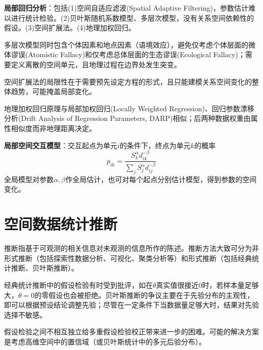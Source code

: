 \par \textbf{局部回归分析}：包括(1)空间自适应滤波(Spatial Adaptive Filtering)，参数估计难以进行统计检验。(2)贝叶斯随机系数模型、多层次模型，没有关系空间依赖性的假设。(3)空间扩展法。(4)地理加权回归。

\par 多层次模型同时包含个体因素和地点因素（语境效应），避免仅考虑个体层面的微体谬误(Atomistic Fallacy)和仅考虑总体层面的生态谬误(Ecological Fallacy)；需要定义离散的空间单元，且地理过程在边界处发生突变。

\par 空间扩展法的局限性在于需要预先设定方程的形式，且只能建模关系空间变化的整体趋势，可能掩盖局部变化。

\par 地理加权回归原理与局部加权回归(Locally Weighted Regression)、回归参数漂移分析(Drift Analysis of Regression Parameters, DARP)相似；后两种数据权重由属性相似度而非地理距离决定。

\par \textbf{局部空间交互模型}：交互起点为单元$i$的条件下，终点为单元$k$的概率
\begin{equation}
    p_{ik}=\frac{S_k^\alpha d_{ik}^{-\beta}}{\sum_j S_j^\alpha d_{ij}^{-\beta}}
\end{equation}
全局模型对参数$\alpha,\beta$作全局估计，也可对每个起点分别估计模型，得到参数的空间变化。

\section{空间数据统计推断}

\par 推断指基于可观测的相关信息对未观测的信息所作的陈述。推断方法大致可分为非形式推断（包括探索性数据分析、可视化、聚类分析等）和形式推断（包括经典统计推断、贝叶斯推断）。

\par 经典统计推断中的假设检验有时受到批评，如在$\theta$真实值很接近0时，若样本量足够大，$\theta=0$的零假设也会被拒绝。贝叶斯推断的争议主要在于先验分布的主观性，即可以根据预设结论调整先验；尽管在一定条件下当数据量足够大时，结果对先验选择不敏感。

\par 假设检验之间不相互独立给多重假设检验校正带来进一步的困难。可能的解决方案是考虑高维空间中的置信域（或贝叶斯统计中的多元后验分布）。